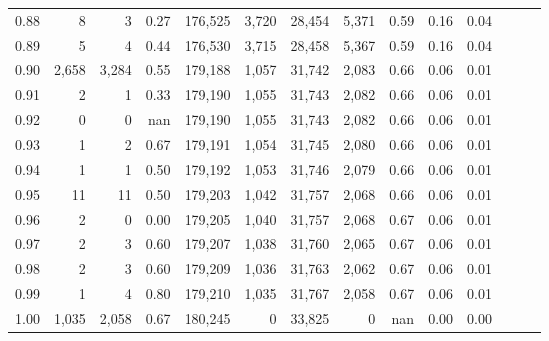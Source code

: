 \begin{tabular}{rrrrrrrrrrrrrr}
0.88 &       8 &      3 &  0.27 &  176,525 &    3,720 &  28,454 &   5,371 &  0.59 &  0.16 &      0.04 \\
0.89 &       5 &      4 &  0.44 &  176,530 &    3,715 &  28,458 &   5,367 &  0.59 &  0.16 &      0.04 \\
0.90 &   2,658 &  3,284 &  0.55 &  179,188 &    1,057 &  31,742 &   2,083 &  0.66 &  0.06 &      0.01 \\
0.91 &       2 &      1 &  0.33 &  179,190 &    1,055 &  31,743 &   2,082 &  0.66 &  0.06 &      0.01 \\
0.92 &       0 &      0 &   nan &  179,190 &    1,055 &  31,743 &   2,082 &  0.66 &  0.06 &      0.01 \\
0.93 &       1 &      2 &  0.67 &  179,191 &    1,054 &  31,745 &   2,080 &  0.66 &  0.06 &      0.01 \\
0.94 &       1 &      1 &  0.50 &  179,192 &    1,053 &  31,746 &   2,079 &  0.66 &  0.06 &      0.01 \\
0.95 &      11 &     11 &  0.50 &  179,203 &    1,042 &  31,757 &   2,068 &  0.66 &  0.06 &      0.01 \\
0.96 &       2 &      0 &  0.00 &  179,205 &    1,040 &  31,757 &   2,068 &  0.67 &  0.06 &      0.01 \\
0.97 &       2 &      3 &  0.60 &  179,207 &    1,038 &  31,760 &   2,065 &  0.67 &  0.06 &      0.01 \\
0.98 &       2 &      3 &  0.60 &  179,209 &    1,036 &  31,763 &   2,062 &  0.67 &  0.06 &      0.01 \\
0.99 &       1 &      4 &  0.80 &  179,210 &    1,035 &  31,767 &   2,058 &  0.67 &  0.06 &      0.01 \\
1.00 &   1,035 &  2,058 &  0.67 &  180,245 &        0 &  33,825 &       0 &   nan &  0.00 &      0.00 \\
\bottomrule
\end{tabular}
